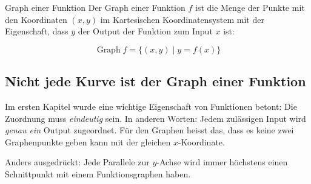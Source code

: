 \begin{definition}
    {Graph einer Funktion}{}
    Der Graph einer Funktion \(f\) ist die Menge der Punkte mit den
    Koordinaten \((x, y)\) im Kartesischen Koordinatensystem mit der
    Eigenschaft, dass \(y\) der Output der Funktion zum Input \(x\) ist:

    \[
        \operatorname{Graph} f
        = \{(x, y) \mid y=f(x)\}
    \]
\end{definition}

\subsection*{Nicht jede Kurve ist der Graph einer Funktion}

Im ersten Kapitel wurde eine wichtige Eigenschaft von Funktionen
betont: Die Zuordnung muss \emph{eindeutig} sein. In anderen Worten:
Jedem zulässigen Input wird \emph{genau ein} Output zugeordnet.
Für den Graphen heisst das, dass es keine zwei Graphenpunkte geben
kann mit der gleichen \(x\)-Koordinate.

Anders ausgedrückt: Jede Parallele zur \(y\)-Achse wird immer
höchstens einen Schnittpunkt mit einem Funktionsgraphen haben.

\begin{center}
\end{center}

